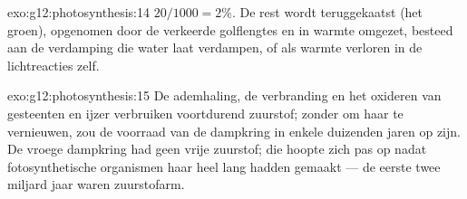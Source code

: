 \begin{solution}{exo:g12:photosynthesis:14}
$20/1000 = 2\%$. De rest wordt teruggekaatst (het groen), opgenomen door
de verkeerde golflengtes en in warmte omgezet, besteed aan de verdamping
die water laat verdampen, of als warmte verloren in de lichtreacties zelf.
\end{solution}

\begin{solution}{exo:g12:photosynthesis:15}
De ademhaling, de verbranding en het oxideren van gesteenten en ijzer
verbruiken voortdurend zuurstof; zonder  om haar te
vernieuwen, zou de voorraad van de dampkring in enkele duizenden jaren op
zijn. De vroege dampkring had geen vrije zuurstof; die hoopte zich pas op
nadat fotosynthetische organismen haar heel lang hadden gemaakt --- de
eerste twee miljard jaar waren zuurstofarm.
\end{solution}

